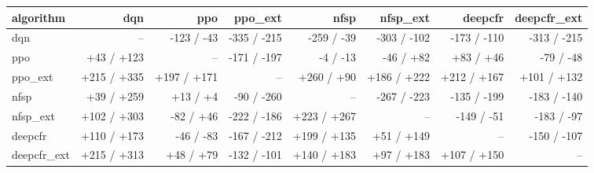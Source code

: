 \begin{tabular}{lrrrrrrr}
\toprule
algorithm & dqn & ppo & ppo\_ext & nfsp & nfsp\_ext & deepcfr & deepcfr\_ext \\
\midrule
dqn & -- & -123 / -43 & -335 / -215 & -259 / -39 & -303 / -102 & -173 / -110 & -313 / -215 \\
ppo & +43 / +123 & -- & -171 / -197 & -4 / -13 & -46 / +82 & +83 / +46 & -79 / -48 \\
ppo\_ext & +215 / +335 & +197 / +171 & -- & +260 / +90 & +186 / +222 & +212 / +167 & +101 / +132 \\
nfsp & +39 / +259 & +13 / +4 & -90 / -260 & -- & -267 / -223 & -135 / -199 & -183 / -140 \\
nfsp\_ext & +102 / +303 & -82 / +46 & -222 / -186 & +223 / +267 & -- & -149 / -51 & -183 / -97 \\
deepcfr & +110 / +173 & -46 / -83 & -167 / -212 & +199 / +135 & +51 / +149 & -- & -150 / -107 \\
deepcfr\_ext & +215 / +313 & +48 / +79 & -132 / -101 & +140 / +183 & +97 / +183 & +107 / +150 & -- \\
\bottomrule
\end{tabular}
